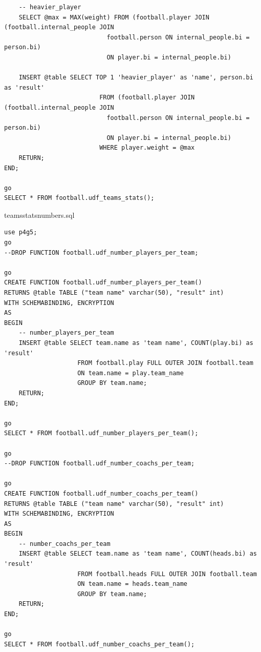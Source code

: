 \documentclass[pdftex,12pt,a4paper]{report}
\begin{document}
\begin{lstlisting}
	-- heavier_player
	SELECT @max = MAX(weight) FROM (football.player JOIN (football.internal_people JOIN
							football.person ON internal_people.bi = person.bi) 
							ON player.bi = internal_people.bi)

	INSERT @table SELECT TOP 1 'heavier_player' as 'name', person.bi as 'result'
						  FROM (football.player JOIN (football.internal_people JOIN
							football.person ON internal_people.bi = person.bi) 
							ON player.bi = internal_people.bi)
						  WHERE player.weight = @max
	RETURN;
END;

go
SELECT * FROM football.udf_teams_stats();
\end{lstlisting}

teams{\textunderscore}stats{\textunderscore}numbers.sql
\begin{lstlisting} 
use p4g5;
go
--DROP FUNCTION football.udf_number_players_per_team;

go
CREATE FUNCTION football.udf_number_players_per_team()
RETURNS @table TABLE ("team name" varchar(50), "result" int)
WITH SCHEMABINDING, ENCRYPTION
AS
BEGIN
	-- number_players_per_team
	INSERT @table SELECT team.name as 'team name', COUNT(play.bi) as 'result'
					FROM football.play FULL OUTER JOIN football.team
					ON team.name = play.team_name
					GROUP BY team.name;
	RETURN;
END;

go
SELECT * FROM football.udf_number_players_per_team();

go
--DROP FUNCTION football.udf_number_coachs_per_team;

go
CREATE FUNCTION football.udf_number_coachs_per_team()
RETURNS @table TABLE ("team name" varchar(50), "result" int)
WITH SCHEMABINDING, ENCRYPTION
AS
BEGIN
	-- number_coachs_per_team
	INSERT @table SELECT team.name as 'team name', COUNT(heads.bi) as 'result'
					FROM football.heads FULL OUTER JOIN football.team
					ON team.name = heads.team_name
					GROUP BY team.name;
	RETURN;
END;

go
SELECT * FROM football.udf_number_coachs_per_team();
\end{lstlisting}
\end{document}
